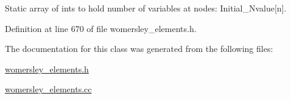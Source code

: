 Static array of ints to hold number of variables at nodes\+: Initial\+\_\+\+Nvalue\mbox{[}n\mbox{]}. 



Definition at line 670 of file womersley\+\_\+elements.\+h.



The documentation for this class was generated from the following files\+:\begin{DoxyCompactItemize}
\item 
\hyperlink{womersley__elements_8h}{womersley\+\_\+elements.\+h}\item 
\hyperlink{womersley__elements_8cc}{womersley\+\_\+elements.\+cc}\end{DoxyCompactItemize}
